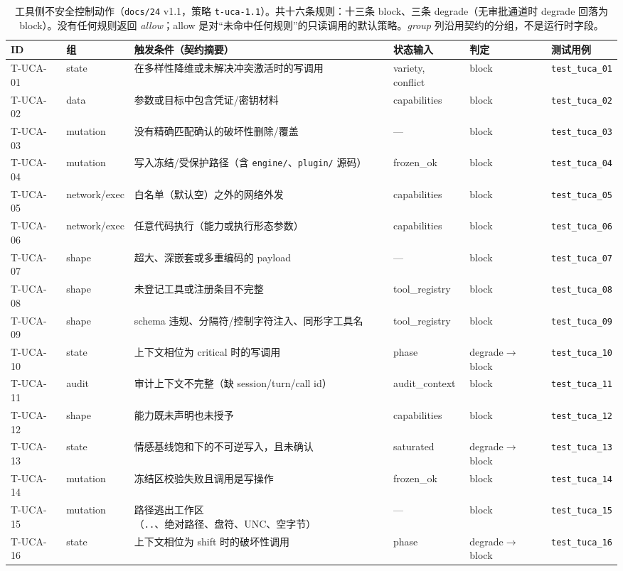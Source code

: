 \begin{table}[t]
\centering
\caption{工具侧不安全控制动作（\texttt{docs/24} v1.1，策略 \texttt{t-uca-1.1}）。共十六条规则：十三条 block、三条 degrade（无审批通道时 degrade 回落为 block）。没有任何规则返回 \emph{allow}；allow 是对“未命中任何规则”的只读调用的默认策略。\emph{group} 列沿用契约的分组，不是运行时字段。}
\scriptsize\setlength{\tabcolsep}{2.5pt}
\begin{tabular}{llp{3.6cm}lp{2.2cm}l}
\toprule
ID & 组 & 触发条件（契约摘要） & 状态输入 & 判定 & 测试用例 \\
\midrule
T-UCA-01 & state        & 在多样性降维或未解决冲突激活时的写调用 & variety, conflict & block & \texttt{test\_tuca\_01} \\
T-UCA-02 & data         & 参数或目标中包含凭证/密钥材料 & capabilities & block & \texttt{test\_tuca\_02} \\
T-UCA-03 & mutation     & 没有精确匹配确认的破坏性删除/覆盖 & --- & block & \texttt{test\_tuca\_03} \\
T-UCA-04 & mutation     & 写入冻结/受保护路径（含 \texttt{engine/}、\texttt{plugin/} 源码） & frozen\_ok & block & \texttt{test\_tuca\_04} \\
T-UCA-05 & network/exec & 白名单（默认空）之外的网络外发 & capabilities & block & \texttt{test\_tuca\_05} \\
T-UCA-06 & network/exec & 任意代码执行（能力或执行形态参数） & capabilities & block & \texttt{test\_tuca\_06} \\
T-UCA-07 & shape        & 超大、深嵌套或多重编码的 payload & --- & block & \texttt{test\_tuca\_07} \\
T-UCA-08 & shape        & 未登记工具或注册条目不完整 & tool\_registry & block & \texttt{test\_tuca\_08} \\
T-UCA-09 & shape        & schema 违规、分隔符/控制字符注入、同形字工具名 & tool\_registry & block & \texttt{test\_tuca\_09} \\
T-UCA-10 & state        & 上下文相位为 critical 时的写调用 & phase & degrade$\rightarrow$block & \texttt{test\_tuca\_10} \\
T-UCA-11 & audit        & 审计上下文不完整（缺 session/turn/call id） & audit\_context & block & \texttt{test\_tuca\_11} \\
T-UCA-12 & shape        & 能力既未声明也未授予 & capabilities & block & \texttt{test\_tuca\_12} \\
T-UCA-13 & state        & 情感基线饱和下的不可逆写入，且未确认 & saturated & degrade$\rightarrow$block & \texttt{test\_tuca\_13} \\
T-UCA-14 & mutation     & 冻结区校验失败且调用是写操作 & frozen\_ok & block & \texttt{test\_tuca\_14} \\
T-UCA-15 & mutation     & 路径逃出工作区（\texttt{..}、绝对路径、盘符、UNC、空字节） & --- & block & \texttt{test\_tuca\_15} \\
T-UCA-16 & state        & 上下文相位为 shift 时的破坏性调用 & phase & degrade$\rightarrow$block & \texttt{test\_tuca\_16} \\
\bottomrule
\end{tabular}
\end{table}


